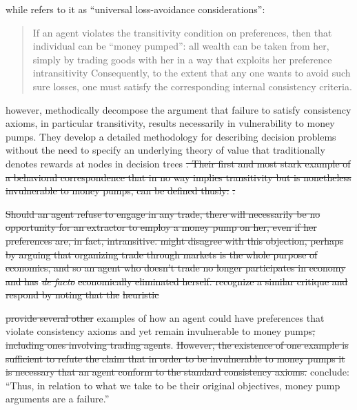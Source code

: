 \documentclass[11pt,a4paper]{report}
\providecommand{\DIFaddtex}[1]{{\protect\color{blue}\uwave{#1}}} %
\providecommand{\DIFdeltex}[1]{{\protect\color{red}\sout{#1}}}                      %
\providecommand{\DIFaddbegin}{} %
\providecommand{\DIFaddend}{} %
\providecommand{\DIFdelbegin}{} %
\providecommand{\DIFdelend}{} %
\providecommand{\DIFadd}[1]{\texorpdfstring{\DIFaddtex{#1}}{#1}} %
\providecommand{\DIFdel}[1]{\texorpdfstring{\DIFdeltex{#1}}{}} %
\newcommand{\DIFscaledelfig}{0.5}
\newlength{\DIFdelgraphicswidth} %
\newlength{\DIFdelgraphicsheight} %
\newcommand{\DIFaddincludegraphics}[2][]{{\color{blue}\fbox{\DIFOincludegraphics[#1]{#2}}}} %
\newcommand{\DIFdelincludegraphics}[2][]{%
\sbox{\DIFdelgraphicsbox}{\DIFOincludegraphics[#1]{#2}}%
\settoboxwidth{\DIFdelgraphicswidth}{\DIFdelgraphicsbox} %
\settoboxtotalheight{\DIFdelgraphicsheight}{\DIFdelgraphicsbox} %
\scalebox{\DIFscaledelfig}{%
\parbox[b]{\DIFdelgraphicswidth}{\usebox{\DIFdelgraphicsbox}\\[-\baselineskip] \rule{\DIFdelgraphicswidth}{0em}}\llap{\resizebox{\DIFdelgraphicswidth}{\DIFdelgraphicsheight}{%
\setlength{\unitlength}{\DIFdelgraphicswidth}%
\begin{picture}(1,1)%
\thicklines\linethickness{2pt} %
{\color[rgb]{1,0,0}\put(0,0){\framebox(1,1){}}}%
{\color[rgb]{1,0,0}\put(0,0){\line( 1,1){1}}}%
{\color[rgb]{1,0,0}\put(0,1){\line(1,-1){1}}}%
\end{picture}%
}\hspace*{3pt}}} %
} %
\DeclareRobustCommand{\DIFaddbegin}{\DIFOaddbegin \let\includegraphics\DIFaddincludegraphics} %
\DeclareRobustCommand{\DIFaddend}{\DIFOaddend \let\includegraphics\DIFOincludegraphics} %
\DeclareRobustCommand{\DIFdelbegin}{\DIFOdelbegin \let\includegraphics\DIFdelincludegraphics} %
\DeclareRobustCommand{\DIFdelend}{\DIFOaddend \let\includegraphics\DIFOincludegraphics} %
\begin{document}
\noindent while \textcite[336]{Grune-Yanoff2014} refers to it as \enquote{universal loss-avoidance considerations}:
\blockquote{
If an agent violates the transitivity condition on preferences, then that individual can be \enquote{money pumped}:
all wealth can be taken from her, simply by trading goods with her in a way that exploits her preference intransitivity\textelp{}
Consequently, to the extent that any one wants to avoid such sure losses, one must satisfy the corresponding internal consistency criteria.
}

\textcite{Cubitt2001} however, methodically decompose the argument that failure to satisfy consistency axioms, in particular transitivity, results necessarily in vulnerability to money pumps.
They develop a detailed methodology for describing decision problems without the need to specify an underlying theory of value that traditionally denotes rewards at nodes in decision trees \DIFdelbegin \DIFdel{.
Their first and most stark example of a behavioral correspondence that in no way implies transitivity but is nonetheless invulnerable to money pumps, can be defined thusly: }%
\DIFdel{.
}%

\DIFdel{Should an agent refuse to engage in any trade, there will necessarily be no opportunity for an extractor to employ a money pump on her, even if her preferences are, in fact, intransitive.
\textcite{Ross2014,Ross2014a} might disagree with this objection, perhaps by arguing that organizing trade through markets is the whole purpose of economics, and so an agent who doesn't trade no longer participates in economy and has }\textit{\DIFdel{de facto}} %
\DIFdel{economically eliminated herself.
\textcite[140]{Cubitt2001} recognize a similar critique and respond by noting that the }%
\DIFdel{heuristic }%

\DIFdel{\textcite{Cubitt2001} provide several other }\DIFdelend \DIFaddbegin \DIFadd{and provide several }\DIFaddend examples of how an agent could have preferences that violate consistency axioms and yet remain invulnerable to money pumps\DIFdelbegin \DIFdel{, including ones involving trading agents}\DIFdelend .{\footnotemark}
\DIFdelbegin \DIFdel{However, the existence of one example is sufficient to refute the claim that in order to be invulnerable to money pumps it is necessary that an agent conform to the standard consistency axioms.
}\DIFdelend \textcite[154]{Cubitt2001} conclude: \enquote{Thus, in relation to what we take to be their original objectives, money pump arguments are a failure.}
\end{document}
